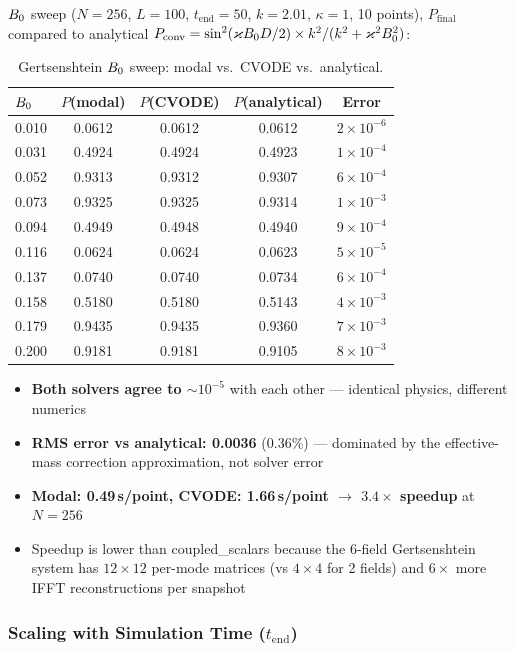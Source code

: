 $B_0$ sweep ($N=256$, $L=100$, $t_\text{end}=50$, $k=2.01$, $\kappa=1$, 10 points), $P_\text{final}$ compared to analytical $P_\mathrm{conv} = \sin^2(\varkappa B_0 D/2) \times k^2/(k^2 + \varkappa^2 B_0^2)$:

\begin{table}[htbp]
\centering
\caption{Gertsenshtein $B_0$ sweep: modal vs.\ CVODE vs.\ analytical.}
\label{tab:modal-gertsenshtein}
\begin{tabular}{@{}lcccc@{}}
\toprule
$B_0$ & $P$(modal) & $P$(CVODE) & $P$(analytical) & Error \\
\midrule
0.010 & 0.0612 & 0.0612 & 0.0612 & $2\times 10^{-6}$ \\
0.031 & 0.4924 & 0.4924 & 0.4923 & $1\times 10^{-4}$ \\
0.052 & 0.9313 & 0.9312 & 0.9307 & $6\times 10^{-4}$ \\
0.073 & 0.9325 & 0.9325 & 0.9314 & $1\times 10^{-3}$ \\
0.094 & 0.4949 & 0.4948 & 0.4940 & $9\times 10^{-4}$ \\
0.116 & 0.0624 & 0.0624 & 0.0623 & $5\times 10^{-5}$ \\
0.137 & 0.0740 & 0.0740 & 0.0734 & $6\times 10^{-4}$ \\
0.158 & 0.5180 & 0.5180 & 0.5143 & $4\times 10^{-3}$ \\
0.179 & 0.9435 & 0.9435 & 0.9360 & $7\times 10^{-3}$ \\
0.200 & 0.9181 & 0.9181 & 0.9105 & $8\times 10^{-3}$ \\
\bottomrule
\end{tabular}
\end{table}

\begin{itemize}
  \item \textbf{Both solvers agree to ${\sim}10^{-5}$} with each other --- identical physics, different numerics
  \item \textbf{RMS error vs analytical: 0.0036} (0.36\%) --- dominated by the effective-mass correction approximation, not solver error
  \item \textbf{Modal: 0.49\,s/point, CVODE: 1.66\,s/point $\to$ $3.4\times$ speedup} at $N=256$
  \item Speedup is lower than coupled\_scalars because the 6-field Gertsenshtein system has $12\times 12$ per-mode matrices (vs $4\times 4$ for 2 fields) and $6\times$ more IFFT reconstructions per snapshot
\end{itemize}

\subsubsection{Scaling with Simulation Time ($t_\text{end}$)}
\label{sec:modal-scaling-tend}

